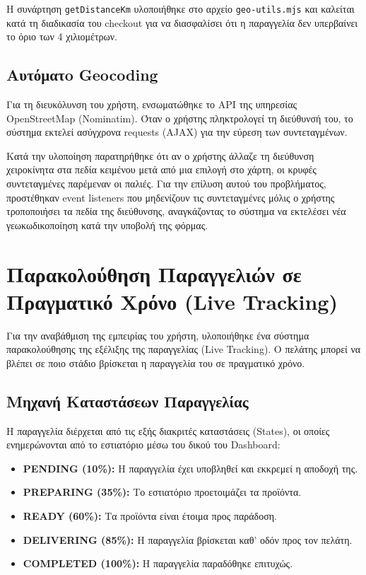 \documentclass[acmsmall,screen,nonacm]{acmart}
\begin{document}
	Η συνάρτηση \texttt{getDistanceKm} υλοποιήθηκε στο αρχείο \texttt{geo-utils.mjs} και καλείται κατά τη διαδικασία του checkout για να διασφαλίσει ότι η παραγγελία δεν υπερβαίνει το όριο των 4 χιλιομέτρων.

	\subsection{Αυτόματo Geocoding}
	Για τη διευκόλυνση του χρήστη, ενσωματώθηκε το API της υπηρεσίας OpenStreetMap (Nominatim). Όταν ο χρήστης πληκτρολογεί τη διεύθυνσή του, το σύστημα εκτελεί ασύγχρονα requests (AJAX) για την εύρεση των συντεταγμένων.

	Κατά την υλοποίηση παρατηρήθηκε ότι αν ο χρήστης άλλαζε τη διεύθυνση χειροκίνητα στα πεδία κειμένου μετά από μια επιλογή στο χάρτη, οι κρυφές συντεταγμένες παρέμεναν οι παλιές. Για την επίλυση αυτού του προβλήματος, προστέθηκαν event listeners που μηδενίζουν τις συντεταγμένες μόλις ο χρήστης τροποποιήσει τα πεδία της διεύθυνσης, αναγκάζοντας το σύστημα να εκτελέσει νέα γεωκωδικοποίηση κατά την υποβολή της φόρμας.

	\section{Παρακολούθηση Παραγγελιών σε Πραγματικό Χρόνο (Live Tracking)}
	Για την αναβάθμιση της εμπειρίας του χρήστη, υλοποιήθηκε ένα σύστημα παρακολούθησης της εξέλιξης της παραγγελίας (Live Tracking). Ο πελάτης μπορεί να βλέπει σε ποιο στάδιο βρίσκεται η παραγγελία του σε πραγματικό χρόνο.

	\subsection{Μηχανή Καταστάσεων Παραγγελίας}
	Η παραγγελία διέρχεται από τις εξής διακριτές καταστάσεις (States), οι οποίες ενημερώνονται από το εστιατόριο μέσω του δικού του Dashboard:
	\begin{itemize}
		\item \textbf{PENDING (10\%):} Η παραγγελία έχει υποβληθεί και εκκρεμεί η αποδοχή της.
		\item \textbf{PREPARING (35\%):} Το εστιατόριο προετοιμάζει τα προϊόντα.
		\item \textbf{READY (60\%):} Τα προϊόντα είναι έτοιμα προς παράδοση.
		\item \textbf{DELIVERING (85\%):} Η παραγγελία βρίσκεται καθ' οδόν προς τον πελάτη.
		\item \textbf{COMPLETED (100\%):} Η παραγγελία παραδόθηκε επιτυχώς.
	\end{itemize}
\end{document}
